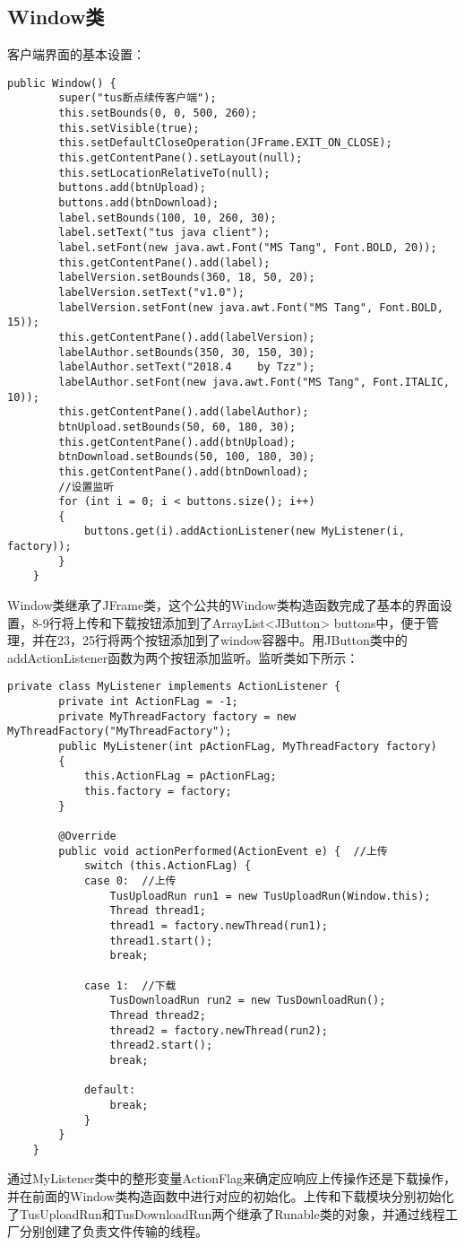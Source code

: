 \documentclass[bachelor]{thesis-uestc}
\begin{document}
\subsection{Window类}
客户端界面的基本设置：
\begin{lstlisting}[title=主界面的设置]
	public Window() {
		super("tus断点续传客户端");
		this.setBounds(0, 0, 500, 260);
		this.setVisible(true);
		this.setDefaultCloseOperation(JFrame.EXIT_ON_CLOSE);
		this.getContentPane().setLayout(null);
		this.setLocationRelativeTo(null);
		buttons.add(btnUpload);
		buttons.add(btnDownload);
		label.setBounds(100, 10, 260, 30);
		label.setText("tus java client");
		label.setFont(new java.awt.Font("MS Tang", Font.BOLD, 20));
		this.getContentPane().add(label);
		labelVersion.setBounds(360, 18, 50, 20);
		labelVersion.setText("v1.0");
		labelVersion.setFont(new java.awt.Font("MS Tang", Font.BOLD, 15));
		this.getContentPane().add(labelVersion);
		labelAuthor.setBounds(350, 30, 150, 30);
		labelAuthor.setText("2018.4    by Tzz");
		labelAuthor.setFont(new java.awt.Font("MS Tang", Font.ITALIC, 10));
		this.getContentPane().add(labelAuthor);
		btnUpload.setBounds(50, 60, 180, 30);
		this.getContentPane().add(btnUpload);
		btnDownload.setBounds(50, 100, 180, 30);
		this.getContentPane().add(btnDownload);
		//设置监听
		for (int i = 0; i < buttons.size(); i++)
		{
			buttons.get(i).addActionListener(new MyListener(i, factory));
		}
	}
\end{lstlisting}
\par Window类继承了JFrame类，这个公共的Window类构造函数完成了基本的界面设置，8-9行将上传和下载按钮添加到了ArrayList<JButton> buttons中，便于管理，并在23，25行将两个按钮添加到了window容器中。用JButton类中的addActionListener函数为两个按钮添加监听。监听类如下所示：
\begin{lstlisting}[title=监听的编写]
private class MyListener implements ActionListener {
		private int ActionFLag = -1;
		private MyThreadFactory factory = new MyThreadFactory("MyThreadFactory");
		public MyListener(int pActionFLag, MyThreadFactory factory)
		{
			this.ActionFLag = pActionFLag;
			this.factory = factory;
		}
		
		@Override
		public void actionPerformed(ActionEvent e) {  //上传
			switch (this.ActionFLag) {
			case 0:  //上传
				TusUploadRun run1 = new TusUploadRun(Window.this);
				Thread thread1;
				thread1 = factory.newThread(run1);
				thread1.start();
				break;
				
			case 1:  //下载
				TusDownloadRun run2 = new TusDownloadRun();
				Thread thread2;
				thread2 = factory.newThread(run2);
				thread2.start();
				break;
				
			default:
				break;
			}
		}
	}
\end{lstlisting}
\par 通过MyListener类中的整形变量ActionFlag来确定应响应上传操作还是下载操作，并在前面的Window类构造函数中进行对应的初始化。上传和下载模块分别初始化了TusUploadRun和TusDownloadRun两个继承了Runable类的对象，并通过线程工厂分别创建了负责文件传输的线程。
\end{document}
